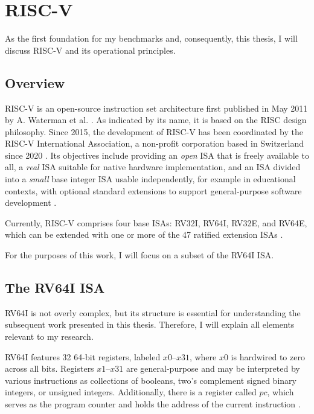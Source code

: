 \chapter{RISC-V}\label{chap:riscv}

As the first foundation for my benchmarks and, consequently, this thesis, I
will discuss RISC-V and its operational principles.

\section{Overview}

RISC-V is an open-source instruction set architecture first published in May
2011 by A. Waterman et al. \cite{first_riscv}. As indicated by its name, it is
based on the RISC design philosophy.  Since
2015, the development of RISC-V has been coordinated by the RISC-V
International Association, a non-profit corporation based in Switzerland since
2020 \cite{riscvorg}. Its objectives include providing an \emph{open} ISA that
is freely available to all, a \emph{real} ISA suitable for native hardware
implementation, and an ISA divided into a \emph{small} base integer ISA usable
independently, for example in educational contexts, with optional standard
extensions to support general-purpose software development \cite[Chapter
      1]{riscv-isa}.

Currently, RISC-V comprises four base ISAs: RV32I, RV64I, RV32E, and RV64E,
which can be extended with one or more of the 47 ratified extension ISAs
\cite[Preface]{riscv-isa}.

 

For the purposes of this work, I will focus on a subset of the RV64I ISA.

\section{The RV64I ISA} \label{sec:riscvIsa}
RV64I is not overly complex, but its structure is essential for understanding
the subsequent work presented in this thesis. Therefore, I will explain all
elements relevant to my research.

RV64I features 32 64-bit registers, labeled $x0$–$x31$, where $x0$ is hardwired
to zero across all bits. Registers $x1$–$x31$ are general-purpose and may be
interpreted by various instructions as collections of booleans, two's
complement signed binary integers, or unsigned integers. Additionally, there is
a register called $pc$, which serves as the program counter and holds the
address of the current instruction \cite[Chapters 4.1, 2.1]{riscv-isa}.

